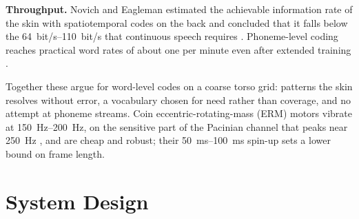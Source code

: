 \documentclass[conference]{IEEEtran}
\begin{document}
\textbf{Throughput.} Novich and Eagleman estimated the achievable information rate of the skin with spatiotemporal codes on the back and concluded that it falls below the \SIrange{64}{110}{bit/s} that continuous speech requires \cite{novich2015}. Phoneme-level coding reaches practical word rates of about one per minute even after extended training \cite{tan2020}.

Together these argue for word-level codes on a coarse torso grid: patterns the skin resolves without error, a vocabulary chosen for need rather than coverage, and no attempt at phoneme streams. Coin eccentric-rotating-mass (ERM) motors vibrate at \SIrange{150}{200}{Hz}, on the sensitive part of the Pacinian channel that peaks near \SI{250}{Hz} \cite{makous1995}, and are cheap and robust; their \SIrange{50}{100}{ms} spin-up sets a lower bound on frame length.

\section{System Design}
\end{document}
